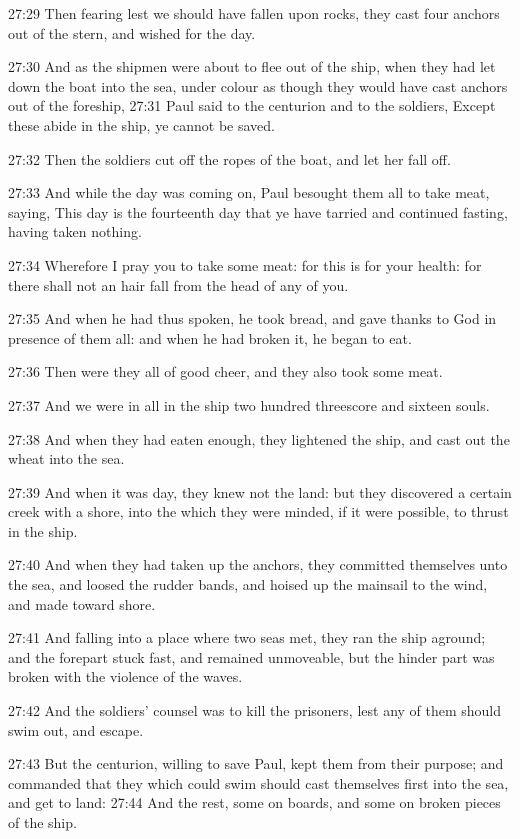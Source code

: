 27:29 Then fearing lest we should have fallen upon rocks, they cast
four anchors out of the stern, and wished for the day.

27:30 And as the shipmen were about to flee out of the ship, when they
had let down the boat into the sea, under colour as though they would
have cast anchors out of the foreship, 27:31 Paul said to the
centurion and to the soldiers, Except these abide in the ship, ye
cannot be saved.

27:32 Then the soldiers cut off the ropes of the boat, and let her
fall off.

27:33 And while the day was coming on, Paul besought them all to take
meat, saying, This day is the fourteenth day that ye have tarried and
continued fasting, having taken nothing.

27:34 Wherefore I pray you to take some meat: for this is for your
health: for there shall not an hair fall from the head of any of you.

27:35 And when he had thus spoken, he took bread, and gave thanks to
God in presence of them all: and when he had broken it, he began to
eat.

27:36 Then were they all of good cheer, and they also took some meat.

27:37 And we were in all in the ship two hundred threescore and
sixteen souls.

27:38 And when they had eaten enough, they lightened the ship, and
cast out the wheat into the sea.

27:39 And when it was day, they knew not the land: but they discovered
a certain creek with a shore, into the which they were minded, if it
were possible, to thrust in the ship.

27:40 And when they had taken up the anchors, they committed
themselves unto the sea, and loosed the rudder bands, and hoised up
the mainsail to the wind, and made toward shore.

27:41 And falling into a place where two seas met, they ran the ship
aground; and the forepart stuck fast, and remained unmoveable, but the
hinder part was broken with the violence of the waves.

27:42 And the soldiers' counsel was to kill the prisoners, lest any of
them should swim out, and escape.

27:43 But the centurion, willing to save Paul, kept them from their
purpose; and commanded that they which could swim should cast
themselves first into the sea, and get to land: 27:44 And the rest,
some on boards, and some on broken pieces of the ship.

